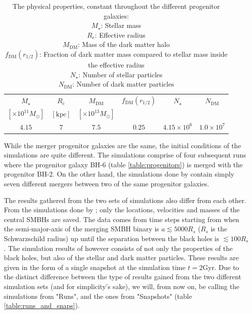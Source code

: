 \documentclass[english, oneside]{HYgradu}
\begin{document}
\begin{table}
	\begin{center}
		\begin{tabular}{c c c c c c}
		\hline
		\hline
		$M_\star$ & $R_e$ & $M_\mathrm{DM}$ & $f_\mathrm{DM}(r_{1/2})$ & $N_\star$ & $N_\mathrm{DM}$ \\
		$[\times 10^{11} M_\odot]$ & $[\mathrm{kpc}]$ & $[\times 10^{13} M_\odot]$ & & & \\
		\hline
		$4.15$ & $7$ & $7.5$ & $0.25$ & $4.15 \times 10^6$ & $1.0 \times 10^7$ \\
		\hline
		\end{tabular}
	\end{center}
	\caption{The physical properties, constant throughout the different progenitor galaxies: \\
	$M_\star$: Stellar mass \\
	$R_e$: Effective radius \\
	$M_\mathrm{DM}$: Mass of the dark matter halo \\
	$f_\mathrm{DM}(r_{1/2})$: Fraction of dark matter mass compared to stellar mass inside the effective radius \\
	$N_\star$: Number of stellar particles \\
	$N_\mathrm{DM}$: Number of dark matter particles}
	\label{table:properties}
\end{table}

While the merger progenitor galaxies are the same, the initial conditions of the simulations are quite different. The \cite{Mannerkoski2019} simulations comprise of four subsequent runs where the progenitor galaxy BH-6 (table \ref{table:progenitors}) is merged with the progenitor BH-2. On the other hand, the simulations done by \cite{Rantala2018} contain simply seven different mergers between two of the same progenitor galaxies.

The results gathered from the two sets of simulations also differ from each other. From the simulations done by \cite{Mannerkoski2019}; only the locations, velocities and masses of the central SMBHs are saved. The data comes from time steps starting from when the semi-major-axis of the merging SMBH binary is $a \lesssim 5000 R_s$ ($R_s$ is the Schwarzschild radius) up until the separation between the black holes is $\lesssim 100 R_s$. The simulation results of \cite{Rantala2018} however consists of not only the properties of the black holes, but also of the stellar and dark matter particles. These results are given in the form of a single snapshot at the simulation time $t = 2 \mathrm{Gyr}$. Due to the distinct difference between the type of results gained from the two different simulation sets (and for simplicity's sake), we will, from now on, be calling the simulations from \cite{Mannerkoski2019} "Runs", and the ones from \cite{Rantala2018} "Snapshots" (table \ref{table:runs_and_snaps}).
\end{document}
